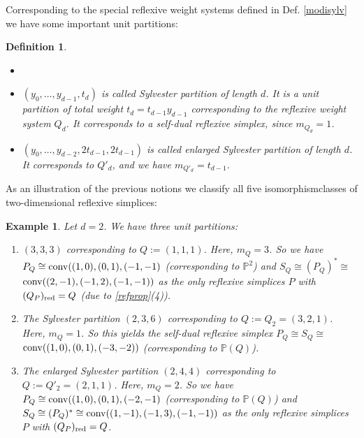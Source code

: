 \documentclass[a4paper,twoside]{article}
\def\P{{\mathbb P}}
\def\red{{\rm red}}
\def\conv{{\rm conv}}
\newtheorem{definition}[theorem]{Definition}
\newtheorem{example}[theorem]{Example}
\begin{document}
\smallskip

Corresponding to the special reflexive weight systems defined in Def. \ref{modisylv} we have some important unit partitions:

\pagebreak

\begin{definition}{\em 
\begin{itemize}
\item[]
\item $(y_0, \ldots, y_{d-1}, t_d)$ is 
called {\em Sylvester partition} of length $d$. 
It is a unit partition of total weight $t_d = t_{d-1} y_{d-1}$ corresponding to the reflexive weight system $Q_d$. 
It corresponds to a {\em self-dual} reflexive simplex, since $m_{Q_d} = 1$.
\item $(y_0, \ldots, y_{d-2}, 2 t_{d-1}, 2 t_{d-1})$ is called {\em enlarged 
Sylvester partition} of length $d$. It corresponds to $Q'_d$, and we have $m_{Q'_d} = t_{d-1}$.
\end{itemize}
}
\end{definition}

As an illustration of the previous notions we classify all five isomorphismclasses of two-dimensional reflexive simplices:

\begin{example}{\rm 
Let $d=2$. We have three unit partitions:

\begin{enumerate}
\item $(3,3,3)$ corresponding to $Q := (1,1,1)$. Here, $m_Q = 3$. So we have $P_Q \cong \conv((1,0),(0,1),(-1,-1)$ 
(corresponding to $\P^2$) and $S_Q \cong (P_Q)^* \cong$\\$\conv((2,-1),(-1,2),(-1,-1))$ 
as the only reflexive simplices $P$ with\\$(Q_P)_\red = Q$ (due to \ref{refprop}(4)).
\item The Sylvester partition $(2,3,6)$ corresponding to $Q := Q_2 = (3,2,1)$. Here, $m_Q = 1$. So this yields 
the self-dual reflexive simplex $P_Q \cong S_Q \cong$\\$\conv((1,0),(0,1),(-3,-2))$ 
(corresponding to $\P(Q)$). 
\item The enlarged Sylvester partition $(2,4,4)$ corresponding to $Q := Q'_2 = (2,1,1)$. 
Here, $m_Q = 2$. So we have $P_Q \cong \conv((1,0),(0,1),(-2,-1)$ 
(corresponding to $\P(Q)$) and $S_Q \cong (P_Q)^* \cong \conv((1,-1),(-1,3),(-1,-1))$ 
as the only reflexive simplices $P$ with $(Q_P)_\red = Q$.
\end{enumerate}
\label{twoweights}
}
\end{example}
\end{document}
